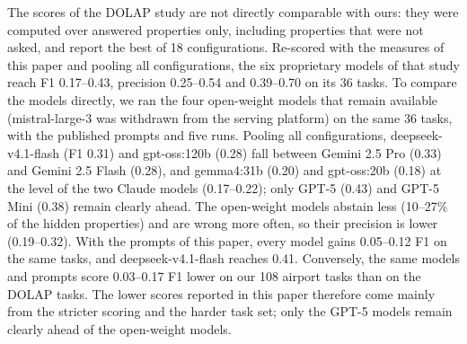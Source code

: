 The scores of the DOLAP study are not directly comparable with ours: they were computed over answered properties only,
including properties that were not asked, and report the best of 18 configurations. Re-scored with the measures of this
paper and pooling all configurations, the six proprietary models of that study reach F1 0.17--0.43, precision 0.25--0.54 and
\fign{} 0.39--0.70 on its 36 tasks. To compare the models directly, we ran the four open-weight models that remain
available (mistral-large-3 was withdrawn from the serving platform) on the same 36 tasks, with the published prompts and five
runs. Pooling all configurations, deepseek-v4.1-flash (F1 0.31) and gpt-oss:120b (0.28) fall between Gemini 2.5 Pro (0.33)
and Gemini 2.5 Flash (0.28), and gemma4:31b (0.20) and gpt-oss:20b (0.18) at the level of the two Claude models
(0.17--0.22); only GPT-5 (0.43) and GPT-5 Mini (0.38) remain clearly ahead. The open-weight models abstain less (10--27\%
of the hidden properties) and are wrong more often, so their precision is lower (0.19--0.32). With the prompts of this paper,
every model gains 0.05--0.12 F1 on the same tasks, and deepseek-v4.1-flash reaches 0.41. Conversely, the same models and
prompts score 0.03--0.17 F1 lower on our 108 airport tasks than on the DOLAP tasks. The lower scores reported in this paper
therefore come mainly from the stricter scoring and the harder task set; only the GPT-5 models remain clearly ahead of the
open-weight models.
